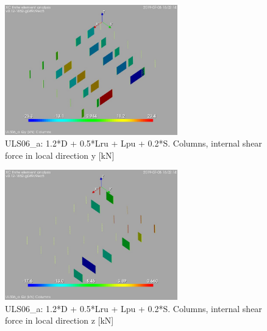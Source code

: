\begin{figure}
\begin{center}
\includegraphics[width=75mm]{annex_res_columns/graphics/resSimplLC/ULS06_acolumnsQy}
\caption{ULS06\_a: 1.2*D + 0.5*Lru + Lpu + 0.2*S. Columns, internal shear force in local direction y [kN]}
\end{center}
\end{figure}
\begin{figure}
\begin{center}
\includegraphics[width=75mm]{annex_res_columns/graphics/resSimplLC/ULS06_acolumnsQz}
\caption{ULS06\_a: 1.2*D + 0.5*Lru + Lpu + 0.2*S. Columns, internal shear force in local direction z [kN]}
\end{center}
\end{figure}

